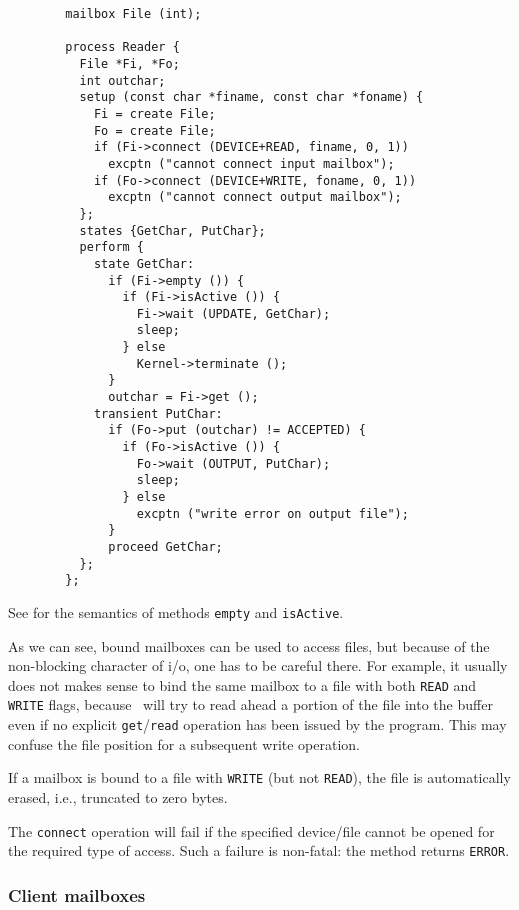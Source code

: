 \begin{verbatim}
        mailbox File (int);

        process Reader {
          File *Fi, *Fo;
          int outchar;
          setup (const char *finame, const char *foname) {
            Fi = create File;
            Fo = create File;
            if (Fi->connect (DEVICE+READ, finame, 0, 1))
              excptn ("cannot connect input mailbox");
            if (Fo->connect (DEVICE+WRITE, foname, 0, 1))
              excptn ("cannot connect output mailbox");
          };
          states {GetChar, PutChar};
          perform {
            state GetChar:
              if (Fi->empty ()) {
                if (Fi->isActive ()) {
                  Fi->wait (UPDATE, GetChar);
                  sleep;
                } else
                  Kernel->terminate ();
              }
              outchar = Fi->get ();
            transient PutChar:
              if (Fo->put (outchar) != ACCEPTED) {
                if (Fo->isActive ()) {
                  Fo->wait (OUTPUT, PutChar);
                  sleep;
                } else
                  excptn ("write error on output file");
              }
              proceed GetChar;
          };
        };
\end{verbatim}

See  for the semantics of methods
{\tt empty} and {\tt isActive}.

\medskip

\noindent
As we can see, bound mailboxes can be used to access files, but because of
the non-blocking character of i/o, one has to be careful there.
For example, it usually does not makes sense to bind the same mailbox to
a file with both {\tt READ} and {\tt WRITE} flags, because \smurph\ will try
to read ahead a portion of the file into the buffer even if no explicit
{\tt get}/{\tt read} operation has been issued by the program.
This may confuse the file position for a subsequent write operation.

If a mailbox is bound to a file with {\tt WRITE} (but not {\tt READ}),
the file is automatically erased, i.e., truncated to zero bytes.

The {\tt connect} operation will fail if the specified device/file
cannot be opened for the required type of access.
Such a failure is non-fatal: the method returns {\tt ERROR}.

\subsubsection{Client mailboxes}
\label{rm_mb_bo_cs}

